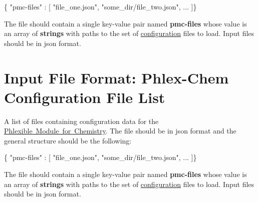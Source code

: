 \begin{DoxyCode}
\{ "pmc-files" : [
  "file\_one.json",
  "some\_dir/file\_two.json",
  ...
]\}
\end{DoxyCode}
 The file should contain a single key-\/value pair named {\bfseries pmc-\/files} whose value is an array of {\bfseries strings} with paths to the set of \mbox{\hyperlink{input_format_phlex_config}{configuration}} files to load. Input files should be in {\ttfamily json} format. \hypertarget{input_format_phlex_file_list}{}\section{Input File Format\+: Phlex-\/\+Chem Configuration File List}\label{input_format_phlex_file_list}
A list of files containing configuration data for the \mbox{\hyperlink{phlex_chem}{Phlexible Module for Chemistry}}. The file should be in {\ttfamily json} format and the general structure should be the following\+:


\begin{DoxyCode}
\{ "pmc-files" : [
  "file\_one.json",
  "some\_dir/file\_two.json",
  ...
]\}
\end{DoxyCode}
 The file should contain a single key-\/value pair named {\bfseries pmc-\/files} whose value is an array of {\bfseries strings} with paths to the set of \mbox{\hyperlink{input_format_phlex_config}{configuration}} files to load. Input files should be in {\ttfamily json} format. 